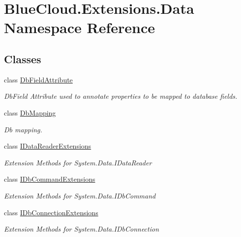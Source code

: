 \hypertarget{namespace_blue_cloud_1_1_extensions_1_1_data}{}\section{Blue\+Cloud.\+Extensions.\+Data Namespace Reference}
\label{namespace_blue_cloud_1_1_extensions_1_1_data}
\subsection*{Classes}
\begin{DoxyCompactItemize}
\item 
class \mbox{\hyperlink{class_blue_cloud_1_1_extensions_1_1_data_1_1_db_field_attribute}{Db\+Field\+Attribute}}
\begin{DoxyCompactList}\small\item\em Db\+Field Attribute used to annotate properties to be mapped to database fields. \end{DoxyCompactList}\item 
class \mbox{\hyperlink{class_blue_cloud_1_1_extensions_1_1_data_1_1_db_mapping}{Db\+Mapping}}
\begin{DoxyCompactList}\small\item\em Db mapping. \end{DoxyCompactList}\item 
class \mbox{\hyperlink{class_blue_cloud_1_1_extensions_1_1_data_1_1_i_data_reader_extensions}{I\+Data\+Reader\+Extensions}}
\begin{DoxyCompactList}\small\item\em Extension Methods for System.\+Data.\+I\+Data\+Reader \end{DoxyCompactList}\item 
class \mbox{\hyperlink{class_blue_cloud_1_1_extensions_1_1_data_1_1_i_db_command_extensions}{I\+Db\+Command\+Extensions}}
\begin{DoxyCompactList}\small\item\em Extension Methods for System.\+Data.\+I\+Db\+Command \end{DoxyCompactList}\item 
class \mbox{\hyperlink{class_blue_cloud_1_1_extensions_1_1_data_1_1_i_db_connection_extensions}{I\+Db\+Connection\+Extensions}}
\begin{DoxyCompactList}\small\item\em Extension Methods for System.\+Data.\+I\+Db\+Connection \end{DoxyCompactList}\item 

\end{DoxyCompactItemize}
